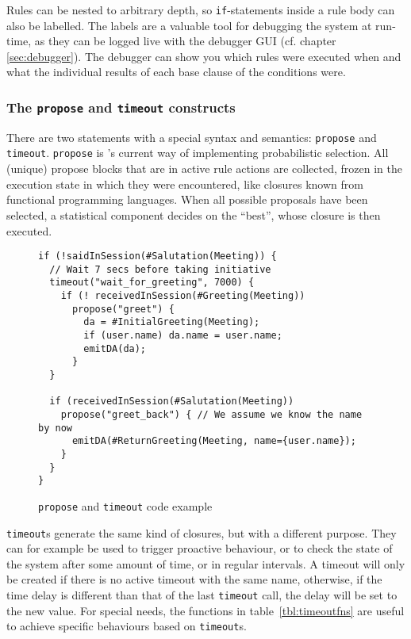 Rules can be nested to arbitrary depth, so \texttt{if}-statements inside a rule
body can also be labelled. The labels are a valuable tool for debugging the
system at run-time, as they can be logged live with the debugger GUI
(cf. chapter \ref{sec:debugger}). The debugger can show you which rules were
executed when and what the individual results of each base clause of the
conditions were.

\subsubsection{The \texttt{propose} and \texttt{timeout} constructs}

There are two statements with a special syntax and semantics: \texttt{propose}
and \texttt{timeout}. \texttt{propose} is \vonda's current way of implementing
probabilistic selection. All (unique) propose blocks that are in active rule
actions are collected, frozen in the execution state in which they were
encountered, like closures known from functional programming languages. When
all possible proposals have been selected, a statistical component decides
on the ``best'', whose closure is then executed.

\begin{figure}[h]
  \centering\small%
\begin{lstlisting}
if (!saidInSession(#Salutation(Meeting)) {
  // Wait 7 secs before taking initiative
  timeout("wait_for_greeting", 7000) {
    if (! receivedInSession(#Greeting(Meeting))
      propose("greet") {
        da = #InitialGreeting(Meeting);
        if (user.name) da.name = user.name;
        emitDA(da);
      }
  }

  if (receivedInSession(#Salutation(Meeting))
    propose("greet_back") { // We assume we know the name by now
      emitDA(#ReturnGreeting(Meeting, name={user.name});
    }
  }
}
\end{lstlisting}\vspace*{-3ex}
  \caption{\texttt{propose} and \texttt{timeout} code example}
  \label{fig:propose}
\end{figure}

\texttt{timeout}s generate the same kind of closures, but with a different
purpose. They can for example be used to trigger proactive behaviour, or to
check the state of the system after some amount of time, or in regular
intervals. A timeout will only be created if there is no active timeout with
the same name, otherwise, if the time delay is different than that of the last
\texttt{timeout} call, the delay will be set to the new value. For special
needs, the functions in table~\ref{tbl:timeoutfns} are useful to achieve
specific behaviours based on \texttt{timeout}s.

